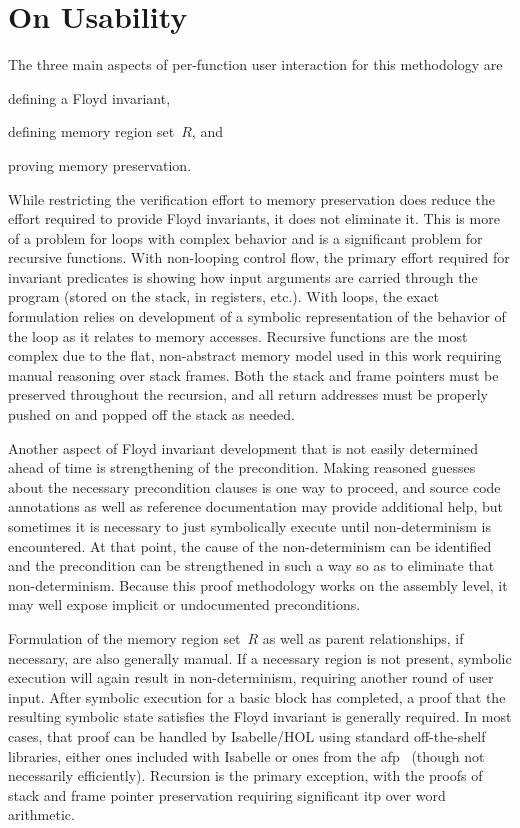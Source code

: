 \section{On Usability}
The three main aspects of per-function user interaction for this methodology are
\begin{enumerate*}
  \item defining a Floyd invariant,
  \item defining memory region set~$R$, and
  \item proving memory preservation.
\end{enumerate*}
While restricting the verification effort to memory preservation
does reduce the effort required to provide Floyd invariants, it does not eliminate it.
This is more of a problem for loops with complex behavior
and is a significant problem for recursive functions.
With non-looping control flow,
the primary effort required for invariant predicates is showing how input arguments
are carried through the program (stored on the stack, in registers, etc.).%
With loops, the exact formulation relies on development of a symbolic representation
of the behavior of the loop as it relates to memory accesses.
Recursive functions are the most complex
due to the flat, non-abstract memory model used in this work
requiring manual reasoning over stack frames.
Both the stack and frame pointers must be preserved throughout the recursion,%
%
and all return addresses must be properly pushed on and popped off the stack as needed.

Another aspect of Floyd invariant development
that is not easily determined ahead of time is strengthening of the precondition.%
Making reasoned guesses about the necessary precondition clauses is one way to proceed,
and source code annotations as well as reference documentation
may provide additional help,
but sometimes it is necessary to just symbolically execute
until non-determinism is encountered.%
At that point, the cause of the non-determinism can be identified
and the precondition can be strengthened in such a way so as to eliminate%
that non-determinism.
Because this proof methodology works on the assembly level,
it may well expose implicit or undocumented preconditions.

Formulation of the memory region set~$R$ as well as parent relationships,%
if necessary, are also generally manual.
If a necessary region is not present,
symbolic execution will again result in non-determinism,
requiring another round of user input.
After symbolic execution for a basic block has completed,
a proof that the resulting symbolic state satisfies the Floyd invariant
is generally required.
In most cases, that proof can be handled by Isabelle/HOL%
using standard off-the-shelf libraries,
either ones included with Isabelle or ones from the \ac{afp}~\citep{afp}
(though not necessarily efficiently).
Recursion is the primary exception,
with the proofs of stack and frame pointer preservation
requiring significant \ac{itp} over word arithmetic.

